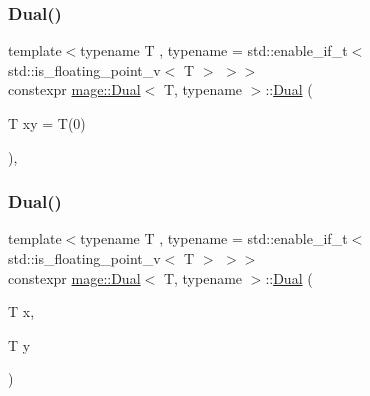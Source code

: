 \subsubsection{\texorpdfstring{Dual()}{Dual()}\hspace{0.1cm}{\footnotesize\ttfamily [1/5]}}
{\footnotesize\ttfamily template$<$typename T , typename  = std\+::enable\+\_\+if\+\_\+t$<$ std\+::is\+\_\+floating\+\_\+point\+\_\+v$<$ T $>$ $>$$>$ \\
constexpr \mbox{\hyperlink{structmage_1_1_dual}{mage\+::\+Dual}}$<$ T, typename $>$\+::\mbox{\hyperlink{structmage_1_1_dual}{Dual}} (\begin{DoxyParamCaption}\item[{T}]{xy = {\ttfamily T(0)} }\end{DoxyParamCaption})\hspace{0.3cm}{\ttfamily [explicit]}, {\ttfamily [noexcept]}}

\mbox{\label{structmage_1_1_dual_a413d0fe95d8e071dbf232ebd31e19101}} 
\subsubsection{\texorpdfstring{Dual()}{Dual()}\hspace{0.1cm}{\footnotesize\ttfamily [2/5]}}
{\footnotesize\ttfamily template$<$typename T , typename  = std\+::enable\+\_\+if\+\_\+t$<$ std\+::is\+\_\+floating\+\_\+point\+\_\+v$<$ T $>$ $>$$>$ \\
constexpr \mbox{\hyperlink{structmage_1_1_dual}{mage\+::\+Dual}}$<$ T, typename $>$\+::\mbox{\hyperlink{structmage_1_1_dual}{Dual}} (\begin{DoxyParamCaption}\item[{T}]{x,  }\item[{T}]{y }\end{DoxyParamCaption})\hspace{0.3cm}{\ttfamily [noexcept]}}

\mbox{\label{structmage_1_1_dual_a4d0d8d4ece5e6fd0931b2c775c6e3479}} 
